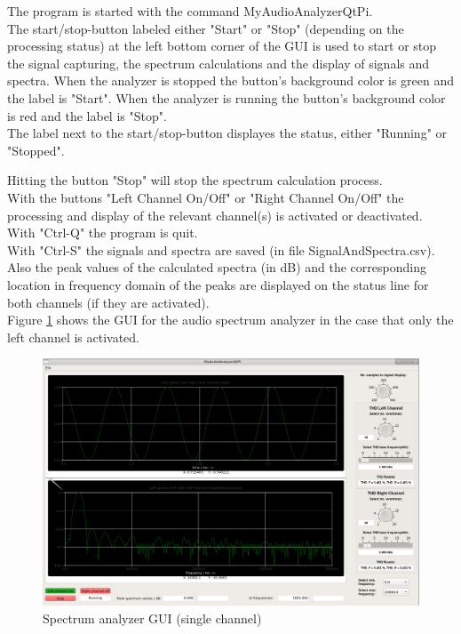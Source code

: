 \documentclass[11pt, oneside]{scrartcl}   	%
\begin{document}
The program is started with the command MyAudioAnalyzerQtPi.\\

The start/stop-button labeled either "Start" or "Stop" (depending on the processing status) at the left bottom corner of the GUI is used to start or stop the signal capturing, the spectrum calculations and the display of signals and spectra.
When the analyzer is stopped the button's background color is green and the label is "Start". When the analyzer is running the button's background color is red and the label is "Stop".\\

The label next to the start/stop-button displayes the status, either "Running" or "Stopped".
 
Hitting the button "Stop" will stop the spectrum calculation process.\\

With the buttons "Left Channel On/Off" or "Right Channel On/Off" the processing and display of the relevant channel(s) is activated or deactivated.\\

With "Ctrl-Q" the program is quit. \\

With "Ctrl-S" the signals and spectra are saved (in file SignalAndSpectra.csv).\\

Also the peak values of the calculated spectra (in dB) and the corresponding location in frequency domain of the peaks are displayed on the status line for both channels (if they are activated).\\

Figure \ref{fig:SpectrumAnalyzerGUI2} shows the GUI for the audio spectrum analyzer in the case that only the left channel is activated.
\begin{figure}[tbph]
	\centering
	\includegraphics[width=\linewidth]{MyAudioSpectrumAnalyzerGUILeftChannel.png}
	\caption[Spectrum analyzer GUI (single channel)]{Spectrum analyzer GUI (single channel)}
	\label{fig:SpectrumAnalyzerGUI2}
\end{figure}
\end{document}
